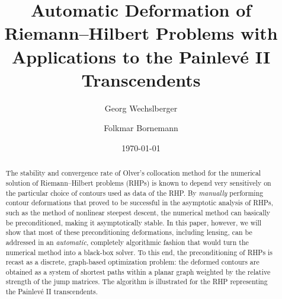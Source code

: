 \documentclass[reqno]{amsart}
\begin{document}
\renewcommand{\figurename}{\small {\sc Figure\@}}
\renewcommand{\tablename}{\small {\sc Table\@}}


\title[Automatic Deformation of Riemann--Hilbert Problems]{Automatic Deformation of Riemann--Hilbert Problems with Applications to the Painlevé II Transcendents}

\author{Georg Wechslberger}
\address{Zentrum Mathematik -- M3, Technische Universität München,
         80290~München, Germany}
\author{Folkmar Bornemann}
\address{Zentrum Mathematik -- M3, Technische Universität München,
         80290~München, Germany}
\date{\today}


\begin{abstract}

The stability and convergence rate of Olver's collocation method for the numerical
solution of Riemann--Hilbert problems (RHPs) is known to depend very sensitively 
on the particular choice of contours used as data of the RHP. By {\em manually}
performing contour deformations that proved to be successful in the asymptotic
analysis of RHPs, such as the {method of nonlinear steepest descent}, 
the numerical method can basically be preconditioned, making it asymptotically stable. 
In this paper, however, we will show that most of these preconditioning deformations, including lensing, can be addressed
in an \emph{automatic}, completely algorithmic fashion that would turn the numerical method into a black-box solver.
To this end, the preconditioning of RHPs is recast as a discrete, graph-based optimization problem: the deformed
contours are obtained as a system of shortest paths within a planar graph weighted by the relative strength of the jump
matrices. The algorithm is illustrated for the RHP representing the Painlevé II transcendents. 




\end{abstract}
\end{document}
